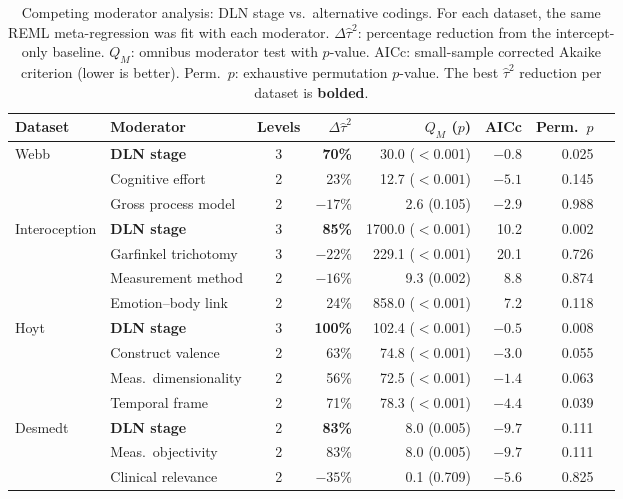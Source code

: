 \documentclass[11pt]{article}
\begin{document}
\begin{table}[ht]
\centering
\small
\caption{Competing moderator analysis: DLN stage vs.\ alternative
codings. For each dataset, the same REML meta-regression was fit with
each moderator. $\Delta\hat\tau^2$: percentage reduction from the
intercept-only baseline. $Q_M$: omnibus moderator test with $p$-value.
AICc: small-sample corrected Akaike criterion
(lower is better). Perm.\ $p$: exhaustive permutation
$p$-value. The best $\hat\tau^2$ reduction per dataset is
\textbf{bolded}.}\label{tab:competing}
\begin{tabular}{llcrrrrc}
\toprule
\textbf{Dataset} & \textbf{Moderator} & \textbf{Levels} &
\textbf{$\Delta\hat\tau^2$} & \textbf{$Q_M$ ($p$)} & \textbf{AICc} &
\textbf{Perm.\ $p$} \\
\midrule
Webb & \textbf{DLN stage} & 3 & \textbf{70\%} & 30.0 ($<$0.001) & $-0.8$ & 0.025 \\
 & Cognitive effort & 2 & 23\% & 12.7 (${<}0.001$) & $-5.1$ & 0.145 \\
 & Gross process model & 2 & $-17\%$ & 2.6 (0.105) & $-2.9$ & 0.988 \\
\midrule
Interoception & \textbf{DLN stage} & 3 & \textbf{85\%} & 1700.0 ($<$0.001) & 10.2 & 0.002 \\
 & Garfinkel trichotomy & 3 & $-22\%$ & 229.1 (${<}0.001$) & 20.1 & 0.726 \\
 & Measurement method & 2 & $-16\%$ & 9.3 (0.002) & 8.8 & 0.874 \\
 & Emotion--body link & 2 & 24\% & 858.0 ($<$0.001) & 7.2 & 0.118 \\
\midrule
Hoyt & \textbf{DLN stage} & 3 & \textbf{100\%} & 102.4 ($<$0.001) & $-0.5$ & 0.008 \\
 & Construct valence & 2 & 63\% & 74.8 ($<$0.001) & $-3.0$ & 0.055 \\
 & Meas.\ dimensionality & 2 & 56\% & 72.5 ($<$0.001) & $-1.4$ & 0.063 \\
 & Temporal frame & 2 & 71\% & 78.3 ($<$0.001) & $-4.4$ & 0.039 \\
\midrule
Desmedt & \textbf{DLN stage} & 2 & \textbf{83\%} & 8.0 (0.005) & $-9.7$ & 0.111 \\
 & Meas.\ objectivity & 2 & 83\% & 8.0 (0.005) & $-9.7$ & 0.111 \\
 & Clinical relevance & 2 & $-35\%$ & 0.1 (0.709) & $-5.6$ & 0.825 \\
\bottomrule
\end{tabular}
\end{table}
\end{document}
